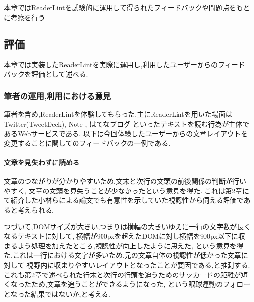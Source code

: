 \chapter{}
本章ではReaderLintを試験的に運用して得られたフィードバックや問題点をもとに考察を行う

\newpage

\section{評価}

本章では実装したReaderLintを実際に運用し,利用したユーザーからのフィードバックを評価として述べる.

\subsection{筆者の運用,利用における意見}
筆者を含め,ReaderLintを体験してもらった.主にReaderLintを用いた場面は
Twitter(TweetDeck)\footnotemark[1]\label{twitter},
Note \footnotemark[2]\label{note},
はてなブログ \footnotemark[3]\label{hatenablog} 
といったテキストを読む行為が主体であるWebサービスである.
以下は今回体験したユーザーからの文章レイアウトを変更することに関してのフィードバックの一例である.

\subsubsection{文章を見失わずに読める}
文章のつながりが分かりやすいため,文末と次行の文頭の前後関係の判断が行いやすく,
文章の文頭を見失うことが少なかったという意見を得た.
これは第2章にて紹介した小林らによる論文でも有意性を示していた視認性から伺える評価であると考えられる.

つづいて,DOMサイズが大きい,つまりは横幅の大きいゆえに一行の文字数が長くなるテキストに対して,
横幅が900pxを超えたDOMに対し横幅を900px以下に収まるよう処理を加えたところ,視認性が向上したように思えた,
という意見を得た.これは一行における文字が多いため,元の文章自体の視認性が低かった文章に対して
視野内に収まりやすいレイアウトとなったことが要因である,と推測する.
これも第2章で述べられた行末と次行の行頭を追うためのサッカードの距離が短くなったため,文章を追うことができるようになった,
という眼球運動のフォローとなった結果ではないか,と考える.

